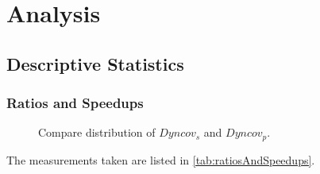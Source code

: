 \chapter{Analysis}
\section{Descriptive Statistics}
\subsection{Ratios and Speedups}
\begin{figure}[!h]
    \caption{Compare distribution of \(Dyncov_s\) and \(Dyncov_p\).}
    \label{fig:fuck}
    
\end{figure}
The measurements taken are listed in \autoref{tab:ratiosAndSpeedups}.
